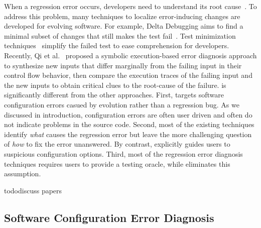 When a regression error occurs, developers need
to understand its root cause~\cite{Banerjee:2010:GID, r2fix}. To address this
problem, many techniques to localize error-inducing
changes are developed for evolving
software. For example, Delta Debugging aims to find a minimal
subset of changes that still makes the test fail~\cite{}.
Test minimization techniques~\cite{} simplify the failed
test to ease comprehension for developers. Recently,
Qi et al.~\cite{} proposed a symbolic execution-based
error diagnosis approach to synthesize new inputs that
differ marginally from the failing input in their
control flow behavior, then compare the execution traces
of the failing input and the new inputs to obtain critical
clues to the root-cause of the failure. \ourtool
is significantly different from the other approaches.
First, \ourtool targets software configuration errors
casued by evolution rather than a regression bug.
As we discussed in introduction, configuration errors are
often user driven and often do not indicate problems in the source
code. Second, most of the existing techniques identify
\textit{what} causes the regression error but leave
the more challenging question of \textit{how} to
fix the error unanswered. By contrast, \ourtool
explicitly guides users to suspicious configuration options.
Third, most of the regression error diagnosis techniques
requires users to provide a testing oracle, while \ourtool
eliminates this assumption.

todo{discuss papers~\cite{Grechanik:2009:MEG, Fischer:2005:SET, Mostafa:2009:TPA,
publication-8111}}


\subsection{Software Configuration Error Diagnosis}

